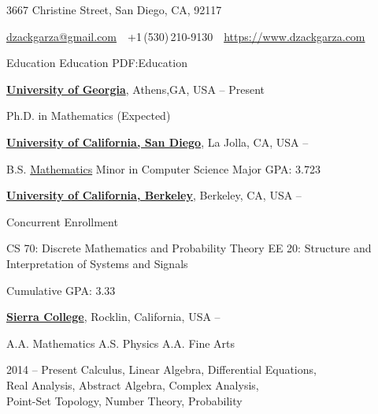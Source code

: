 \documentclass[letterpaper,MMMyyyy,nonstopmode]{simpleresumecv}
\newcommand{\CVAuthor}{D. Zack Garza}
\newcommand{\CVWebpage}{https://www.dzackgarza.com}
\begin{document}

\Title{\CVAuthor}

\begin{SubTitle}
3667 Christine Street, San Diego, CA, 92117
\par
\href{mailto:dzackgarza@gmail.com}
{dzackgarza@gmail.com}
\,\SubBulletSymbol\,
+1\,(530)\,210-9130
\,\SubBulletSymbol\,
\href{\CVWebpage}
{\url{\CVWebpage}}
\end{SubTitle}

\begin{Body}


\Section
{Education}
{Education}
{PDF:Education}

\Entry
\href{https://www.math.uga.edu/}
{\textbf{University of Georgia}},
Athens,GA, USA
\hfill
{} --
Present

\Gap
\BulletItem Ph.D. in Mathematics (Expected)

\BigGap
\Entry
\href{https://www.math.ucsd.edu}
{\textbf{University of California, San Diego}},
La Jolla, CA, USA
\hfill
{} --

\Gap
\BulletItem
B.S.
\href{https://math.ucsd.edu/programs/undergraduate/}
{Mathematics}
\BulletItem Minor in Computer Science
\BulletItem
Major GPA: 3.723

\BigGap
\Entry
\href{https://eecs.berkeley.edu}
{\textbf{University of California, Berkeley}},
Berkeley, CA, USA
\hfill
{} --
\Gap

\BulletItem
Concurrent Enrollment
\begin{Detail}
\SubBulletItem
CS 70: Discrete Mathematics and Probability Theory
\SubBulletItem
EE 20: Structure and Interpretation of Systems and Signals
\end{Detail}
\BulletItem
Cumulative GPA: 3.33


\BigGap
\Entry
\href{https://www.sierracollege.edu}
{\textbf{Sierra College}},
Rocklin, California, USA
\hfill
{} --

\Gap
\BulletItem
A.A. Mathematics
\hfill
\BulletItem
A.S. Physics
\hfill
\BulletItem
A.A. Fine Arts



\hfill
2014 -- Present
\Gap
\BulletItem Calculus, Linear Algebra, Differential Equations, \\
Real Analysis, Abstract Algebra, Complex Analysis, \\
Point-Set Topology, Number Theory, Probability


\end{Body}
\end{document}
